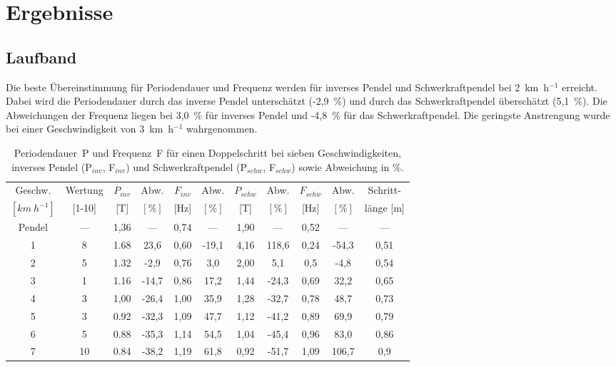 \section{Ergebnisse}



\subsection{Laufband}
Die beste Übereinstimmung für Periodendauer und Frequenz werden für inverses Pendel und Schwerkraftpendel bei 2~km~h$^{-1}$ erreicht. Dabei wird die Periodendauer durch das inverse Pendel unterschätzt (-2,9~\%) und durch das Schwerkraftpendel überschätzt (5,1~\%). Die Abweichungen der Frequenz liegen bei 3,0~\% für inverses Pendel und -4,8~\% für das Schwerkraftpendel. Die geringste Anstrengung wurde bei einer Geschwindigkeit von 3~km~h$^{-1}$ wahrgenommen.

\begin{table}[h!]
\centering
\caption[Ergebnisse Laufbandversuch]{Periodendauer~P und Frequenz~F für einen Doppelschritt bei sieben Geschwindigkeiten, inverses Pendel (P$_{inv}$, F$_{inv}$) und Schwerkraftpendel (P$_{schw}$, F$_{schw}$) sowie Abweichung in \%.}
\label{tab:Erg_Pend}
\begin{tabular}{c c c c c c c c c c c}
\toprule
Geschw. & Wertung & $P_{inv}$ & Abw. & $F_{inv}$ & Abw. & $P_{schw}$ & Abw. & $F_{schw}$ & Abw. & Schritt-\\
$[km~h^{-1}]$  & [1-10] & [T] & $[\%]$ & [Hz] & $[\%]$ &  [T] & $[\%]$ & [Hz] & $[\%]$ & länge [m]\\
\midrule
Pendel	&---& 1,36 	& ---	& 0,74 	& ---	& 1,90	&---	& 0,52&	---		& ---	\\
1 		& 8	& 1.68 	& 23,6	& 0,60 	&  -19,1& 4,16	& 118,6	& 0,24&	-54,3	& 0,51	\\
2 		& 5 & 1.32 	& -2,9	& 0,76 	&  3,0	& 2,00	& 5,1 	& 0,5 &	-4,8	& 0,54	\\
3 		& 1 & 1.16 	& -14,7	& 0,86 	& 17,2	& 1,44	& -24,3	& 0,69&	32,2	& 0,65	\\
4 		& 3 & 1,00	& -26,4	& 1,00 	& 35,9	& 1,28	& -32,7	& 0,78&	48,7	& 0,73	\\
5 		& 3 & 0.92 	& -32,3	& 1,09 	& 47,7	& 1,12	& -41,2	& 0,89&	69,9	& 0,79	\\
6 		& 5 & 0.88 	& -35,3	& 1,14 	& 54,5	& 1,04	& -45,4	& 0,96&	83,0	& 0,86	\\
7 		& 10& 0.84 	& -38,2	& 1,19 	& 61,8	& 0,92	& -51,7	& 1,09&	106,7	& 0,9	\\
\bottomrule
\end{tabular}
\end{table}

